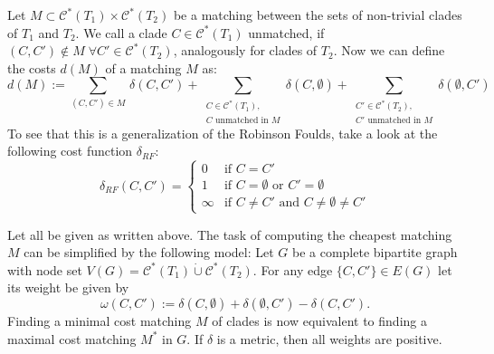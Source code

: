 Let $M \subset \mathcal{C}^*(T_1) \times \mathcal{C}^*(T_2)$ be a matching between the sets of non-trivial clades of $T_1$ and $T_2$. We call a clade $C \in \mathcal{C}^*(T_1)$ unmatched, if $(C, C') \notin M \; \forall C' \in \mathcal{C}^*(T_2)$, analogously for clades of $T_2$. Now we can define the costs $d(M)$ of a matching $M$ as:
$$d(M) := \sum_{(C, C') \in M} \, \delta(C,C') + \sum_{\substack{C \in \mathcal{C}^*(T_1),\\ C\text{ unmatched in }M}} \delta(C, \emptyset) + \sum_{\substack{C' \in \mathcal{C}^*(T_2),\\C'\text{ unmatched in }M}} \delta(\emptyset, C')$$
To see that this is a generalization of the Robinson Foulds, take a look at the following cost function $\delta_{RF}$:
$$\delta_{RF}(C, C') = 
\begin{cases}
	0 & \text{if } C = C' \\
	1 & \text{if } C = \emptyset \text{ or } C' = \emptyset \\
	\infty & \text{if } C \neq C' \text{ and } C \neq \emptyset \neq C'
\end{cases}$$
\begin{lem}\label{lem:costfct}
Let all be given as written above. The task of computing the cheapest matching $M$ can be simplified by the following model: Let $G$ be a complete bipartite graph with node set $V(G) = \mathcal{C}^*(T_1) \dot{\cup} \mathcal{C}^*(T_2)$. For any edge $\{C,C'\} \in E(G)$ let its weight be given by 
\begin{equation} \label{eq:costfct}
\omega(C,C') := \delta(C,\emptyset) + \delta(\emptyset, C') - \delta(C,C').
\end{equation}
Finding a minimal cost matching $M$ of clades is now equivalent to finding a maximal cost matching $M^*$ in $G$. If $\delta$ is a metric, then all weights are positive.
\end{lem}
